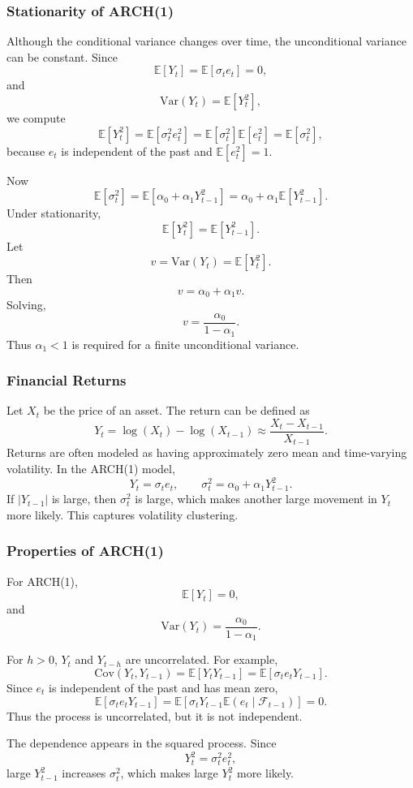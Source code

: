 \documentclass[12pt,oneside]{book}
\numberwithin{equation}{section}
\theoremstyle{definition}
\theoremstyle{plain}
\theoremstyle{remark}
\newcommand{\E}{\mathbb{E}}
\newcommand{\Var}{\mathrm{Var}}
\newcommand{\Cov}{\mathrm{Cov}}
\begin{document}
\subsubsection{Stationarity of ARCH(1)}

Although the conditional variance changes over time, the unconditional variance can be constant. Since
\[
\E[Y_t]=\E[\sigma_te_t]=0,
\]
and
\[
\Var(Y_t)=\E[Y_t^2],
\]
we compute
\[
\E[Y_t^2]
=
\E[\sigma_t^2e_t^2]
=
\E[\sigma_t^2]\E[e_t^2]
=
\E[\sigma_t^2],
\]
because $e_t$ is independent of the past and $\E[e_t^2]=1$.

Now
\[
\E[\sigma_t^2]
=
\E[\alpha_0+\alpha_1Y_{t-1}^2]
=
\alpha_0+\alpha_1\E[Y_{t-1}^2].
\]
Under stationarity,
\[
\E[Y_t^2]=\E[Y_{t-1}^2].
\]
Let
\[
v=\Var(Y_t)=\E[Y_t^2].
\]
Then
\[
v=\alpha_0+\alpha_1v.
\]
Solving,
\[
v=\frac{\alpha_0}{1-\alpha_1}.
\]
Thus $\alpha_1<1$ is required for a finite unconditional variance.

\subsubsection{Financial Returns}

Let $X_t$ be the price of an asset. The return can be defined as
\[
Y_t
=
\log(X_t)-\log(X_{t-1})
\approx
\frac{X_t-X_{t-1}}{X_{t-1}}.
\]
Returns are often modeled as having approximately zero mean and time-varying volatility. In the ARCH(1) model,
\[
Y_t=\sigma_te_t,
\qquad
\sigma_t^2=\alpha_0+\alpha_1Y_{t-1}^2.
\]
If $|Y_{t-1}|$ is large, then $\sigma_t^2$ is large, which makes another large movement in $Y_t$ more likely. This captures volatility clustering.

\subsubsection{Properties of ARCH(1)}

For ARCH(1),
\[
\E[Y_t]=0,
\]
and
\[
\Var(Y_t)=\frac{\alpha_0}{1-\alpha_1}.
\]

For $h>0$, $Y_t$ and $Y_{t-h}$ are uncorrelated. For example,
\[
\Cov(Y_t,Y_{t-1})
=
\E[Y_tY_{t-1}]
=
\E[\sigma_te_tY_{t-1}].
\]
Since $e_t$ is independent of the past and has mean zero,
\[
\E[\sigma_te_tY_{t-1}]
=
\E[\sigma_tY_{t-1}\E(e_t\mid \mathcal{F}_{t-1})]
=
0.
\]
Thus the process is uncorrelated, but it is not independent.

The dependence appears in the squared process. Since
\[
Y_t^2=\sigma_t^2e_t^2,
\]
large $Y_{t-1}^2$ increases $\sigma_t^2$, which makes large $Y_t^2$ more likely.
\end{document}
